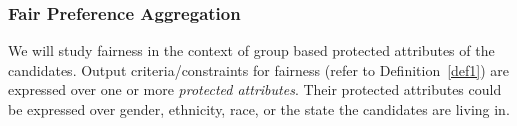 \documentclass[11pt]{article}
\begin{document}


\subsubsection{Fair Preference Aggregation}
We will study fairness in the context of group based protected attributes of the candidates. Output criteria/constraints for fairness (refer to Definition~\ref{def1}) are expressed over one or more {\em protected attributes}. Their protected attributes could be expressed over gender, ethnicity, race, or the state the candidates are living in. 
\end{document}
